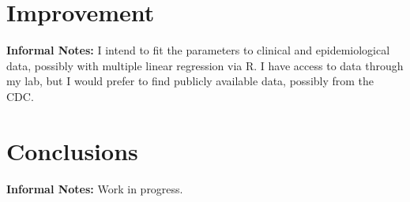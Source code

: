\documentclass[11pt]{article}
\begin{document}
\section*{Improvement}

\textbf{Informal Notes: }I intend to fit the parameters to clinical and epidemiological data, possibly with multiple linear regression via R. I have access to data through my lab, but I would prefer to find publicly available data, possibly from the CDC.

\section*{Conclusions}

\textbf{Informal Notes: }Work in progress.

\clearpage 


\end{document}
